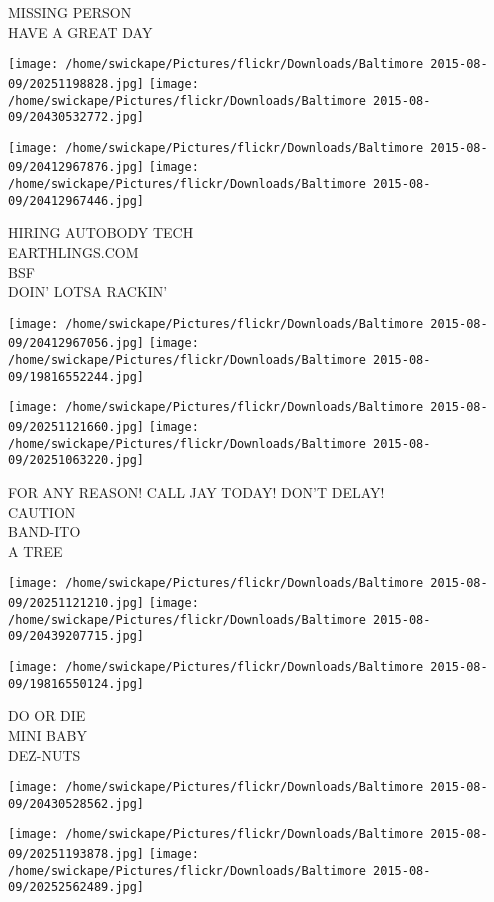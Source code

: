 \documentclass[10pt,letterpaper]{article}
\begin{document}
MISSING PERSON\\
HAVE A GREAT DAY\\
\pagebreak

\texttt{[image: /home/swickape/Pictures/flickr/Downloads/Baltimore 2015-08-09/20251198828.jpg]}
\texttt{[image: /home/swickape/Pictures/flickr/Downloads/Baltimore 2015-08-09/20430532772.jpg]}

\texttt{[image: /home/swickape/Pictures/flickr/Downloads/Baltimore 2015-08-09/20412967876.jpg]}
\texttt{[image: /home/swickape/Pictures/flickr/Downloads/Baltimore 2015-08-09/20412967446.jpg]}

HIRING AUTOBODY TECH\\
EARTHLINGS.COM\\
BSF\\
DOIN' LOTSA RACKIN'\\
\pagebreak

\texttt{[image: /home/swickape/Pictures/flickr/Downloads/Baltimore 2015-08-09/20412967056.jpg]}
\texttt{[image: /home/swickape/Pictures/flickr/Downloads/Baltimore 2015-08-09/19816552244.jpg]}

\texttt{[image: /home/swickape/Pictures/flickr/Downloads/Baltimore 2015-08-09/20251121660.jpg]}
\texttt{[image: /home/swickape/Pictures/flickr/Downloads/Baltimore 2015-08-09/20251063220.jpg]}

FOR ANY REASON!  CALL JAY TODAY!  DON'T DELAY!\\
CAUTION\\
BAND{-}ITO\\
A TREE\\
\pagebreak

\texttt{[image: /home/swickape/Pictures/flickr/Downloads/Baltimore 2015-08-09/20251121210.jpg]}
\texttt{[image: /home/swickape/Pictures/flickr/Downloads/Baltimore 2015-08-09/20439207715.jpg]}

\texttt{[image: /home/swickape/Pictures/flickr/Downloads/Baltimore 2015-08-09/19816550124.jpg]}

DO OR DIE\\
MINI BABY\\
DEZ{-}NUTS\\
\pagebreak

\texttt{[image: /home/swickape/Pictures/flickr/Downloads/Baltimore 2015-08-09/20430528562.jpg]}

\vspace{0.25in}
\texttt{[image: /home/swickape/Pictures/flickr/Downloads/Baltimore 2015-08-09/20251193878.jpg]}
\texttt{[image: /home/swickape/Pictures/flickr/Downloads/Baltimore 2015-08-09/20252562489.jpg]}
\end{document}
